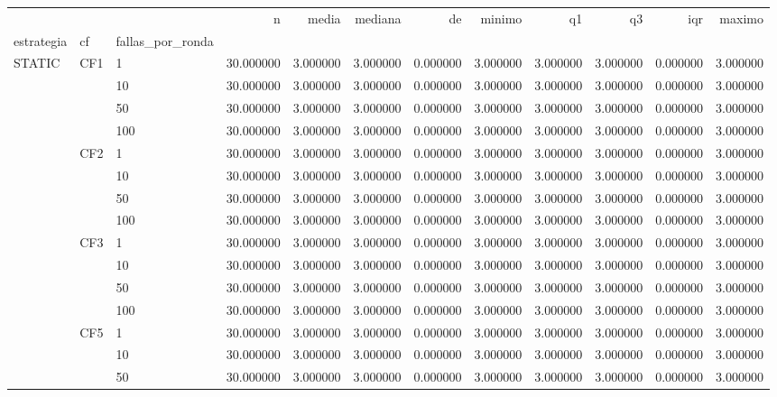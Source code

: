 \begin{tabular}{lllrrrrrrrrr}
\toprule
 &  &  & n & media & mediana & de & minimo & q1 & q3 & iqr & maximo \\
estrategia & cf & fallas_por_ronda &  &  &  &  &  &  &  &  &  \\
\midrule
\multirow[t]{16}{*}{STATIC} & \multirow[t]{4}{*}{CF1} & 1 & 30.000000 & 3.000000 & 3.000000 & 0.000000 & 3.000000 & 3.000000 & 3.000000 & 0.000000 & 3.000000 \\
 &  & 10 & 30.000000 & 3.000000 & 3.000000 & 0.000000 & 3.000000 & 3.000000 & 3.000000 & 0.000000 & 3.000000 \\
 &  & 50 & 30.000000 & 3.000000 & 3.000000 & 0.000000 & 3.000000 & 3.000000 & 3.000000 & 0.000000 & 3.000000 \\
 &  & 100 & 30.000000 & 3.000000 & 3.000000 & 0.000000 & 3.000000 & 3.000000 & 3.000000 & 0.000000 & 3.000000 \\
\cline{2-12}
 & \multirow[t]{4}{*}{CF2} & 1 & 30.000000 & 3.000000 & 3.000000 & 0.000000 & 3.000000 & 3.000000 & 3.000000 & 0.000000 & 3.000000 \\
 &  & 10 & 30.000000 & 3.000000 & 3.000000 & 0.000000 & 3.000000 & 3.000000 & 3.000000 & 0.000000 & 3.000000 \\
 &  & 50 & 30.000000 & 3.000000 & 3.000000 & 0.000000 & 3.000000 & 3.000000 & 3.000000 & 0.000000 & 3.000000 \\
 &  & 100 & 30.000000 & 3.000000 & 3.000000 & 0.000000 & 3.000000 & 3.000000 & 3.000000 & 0.000000 & 3.000000 \\
\cline{2-12}
 & \multirow[t]{4}{*}{CF3} & 1 & 30.000000 & 3.000000 & 3.000000 & 0.000000 & 3.000000 & 3.000000 & 3.000000 & 0.000000 & 3.000000 \\
 &  & 10 & 30.000000 & 3.000000 & 3.000000 & 0.000000 & 3.000000 & 3.000000 & 3.000000 & 0.000000 & 3.000000 \\
 &  & 50 & 30.000000 & 3.000000 & 3.000000 & 0.000000 & 3.000000 & 3.000000 & 3.000000 & 0.000000 & 3.000000 \\
 &  & 100 & 30.000000 & 3.000000 & 3.000000 & 0.000000 & 3.000000 & 3.000000 & 3.000000 & 0.000000 & 3.000000 \\
\cline{2-12}
 & \multirow[t]{4}{*}{CF5} & 1 & 30.000000 & 3.000000 & 3.000000 & 0.000000 & 3.000000 & 3.000000 & 3.000000 & 0.000000 & 3.000000 \\
 &  & 10 & 30.000000 & 3.000000 & 3.000000 & 0.000000 & 3.000000 & 3.000000 & 3.000000 & 0.000000 & 3.000000 \\
 &  & 50 & 30.000000 & 3.000000 & 3.000000 & 0.000000 & 3.000000 & 3.000000 & 3.000000 & 0.000000 & 3.000000 \\

\end{tabular}
